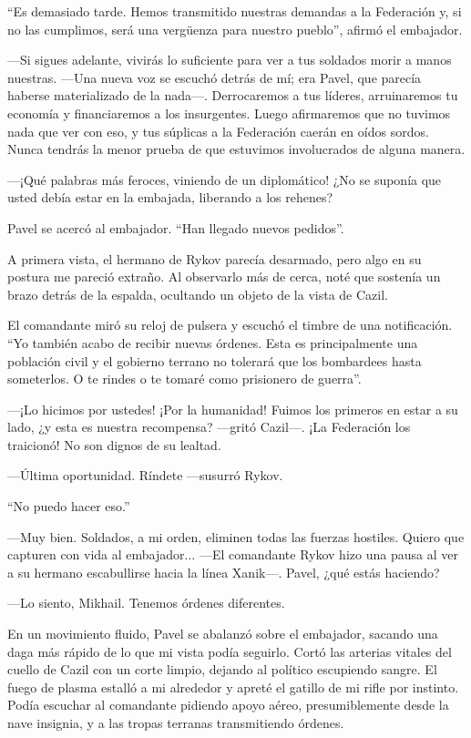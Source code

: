 ``Es demasiado tarde. Hemos transmitido nuestras demandas a la Federación y, si no las cumplimos, será una vergüenza para nuestro pueblo'', afirmó el embajador.

—Si sigues adelante, vivirás lo suficiente para ver a tus soldados morir a manos nuestras. —Una nueva voz se escuchó detrás de mí; era Pavel, que parecía haberse materializado de la nada—. Derrocaremos a tus líderes, arruinaremos tu economía y financiaremos a los insurgentes. Luego afirmaremos que no tuvimos nada que ver con eso, y tus súplicas a la Federación caerán en oídos sordos. Nunca tendrás la menor prueba de que estuvimos involucrados de alguna manera.

—¡Qué palabras más feroces, viniendo de un diplomático! ¿No se suponía que usted debía estar en la embajada, liberando a los rehenes?

Pavel se acercó al embajador. ``Han llegado nuevos pedidos''.

A primera vista, el hermano de Rykov parecía desarmado, pero algo en su postura me pareció extraño. Al observarlo más de cerca, noté que sostenía un brazo detrás de la espalda, ocultando un objeto de la vista de Cazil.

El comandante miró su reloj de pulsera y escuchó el timbre de una notificación. ``Yo también acabo de recibir nuevas órdenes. Esta es principalmente una población civil y el gobierno terrano no tolerará que los bombardees hasta someterlos. O te rindes o te tomaré como prisionero de guerra''.

—¡Lo hicimos por ustedes! ¡Por la humanidad! Fuimos los primeros en estar a su lado, ¿y esta es nuestra recompensa? —gritó Cazil—. ¡La Federación los traicionó! No son dignos de su lealtad.

—Última oportunidad. Ríndete —susurró Rykov.

``No puedo hacer eso.''


—Muy bien. Soldados, a mi orden, eliminen todas las fuerzas hostiles. Quiero que capturen con vida al embajador... —El comandante Rykov hizo una pausa al ver a su hermano escabullirse hacia la línea Xanik—. Pavel, ¿qué estás haciendo?

—Lo siento, Mikhail. Tenemos órdenes diferentes.

En un movimiento fluido, Pavel se abalanzó sobre el embajador, sacando una daga más rápido de lo que mi vista podía seguirlo. Cortó las arterias vitales del cuello de Cazil con un corte limpio, dejando al político escupiendo sangre. El fuego de plasma estalló a mi alrededor y apreté el gatillo de mi rifle por instinto. Podía escuchar al comandante pidiendo apoyo aéreo, presumiblemente desde la nave insignia, y a las tropas terranas transmitiendo órdenes.

